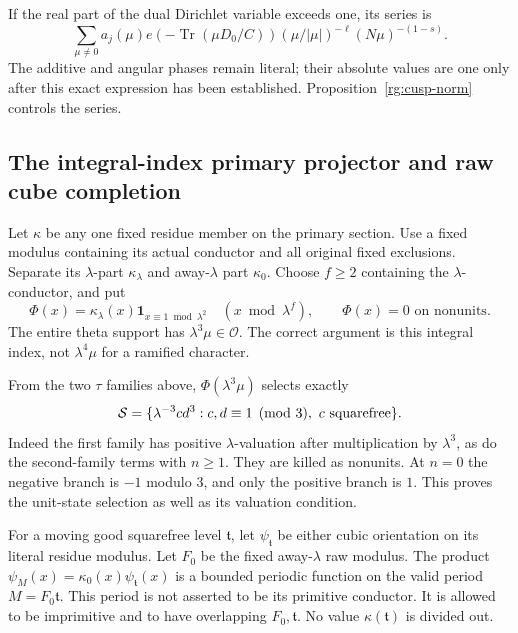 If the real part of the dual Dirichlet variable exceeds one, its series is
\begin{equation}\label{rg:dual-translated-series}
 \sum_{\mu\ne0}a_j(\mu)e(-\operatorname{Tr}(\mu D_0/C))
       (\mu/|\mu|)^{-\ell}(N\mu)^{-(1-s)} .
\end{equation}
The additive and angular phases remain literal; their absolute values
are one only after this exact expression has been established.
Proposition~\ref{rg:cusp-norm} controls the series.

\subsection{The integral-index primary projector and raw cube completion}
\label{rg:projector-proof}
Let \(\kappa\) be any one fixed residue member on the primary section.
Use a fixed modulus containing its actual conductor and all original
fixed exclusions. Separate its \(\lambda\)-part \(\kappa_\lambda\)
and away-\(\lambda\) part \(\kappa_0\).
Choose \(f\ge2\) containing the \(\lambda\)-conductor, and put
\begin{equation}\label{rg:primary-projector}
 \Phi(x)=\kappa_\lambda(x)
               \mathbf1_{x\equiv1\bmod\lambda^2}
          \quad(x\bmod\lambda^f),
 \qquad \Phi(x)=0\text{ on nonunits}.
\end{equation}
The entire theta support has \(\lambda^3\mu\in\mathcal O\).
The correct argument is this integral index, not
\(\lambda^4\mu\) for a ramified character.

From the two \(\tau\) families above, \(\Phi(\lambda^3\mu)\)
selects exactly
\begin{equation}\label{rg:primary-support}
 \mathcal S=\{\lambda^{-3}cd^3:
               c,d\equiv1\pmod3,\ c\ {\rm squarefree}\}.
\end{equation}
Indeed the first family has positive \(\lambda\)-valuation after
multiplication by \(\lambda^3\), as do the second-family terms
with \(n\ge1\). They are killed as nonunits.
At \(n=0\) the negative branch is \(-1\) modulo \(3\),
and only the positive branch is \(1\).
This proves the unit-state selection as well as its valuation condition.

For a moving good squarefree level \(\mathfrak t\), let
\(\psi_{\mathfrak t}\) be either cubic orientation on its literal
residue modulus. Let \(F_0\) be the fixed away-\(\lambda\) raw modulus.
The product
\(\psi_M(x)=\kappa_0(x)\psi_{\mathfrak t}(x)\)
is a bounded periodic function on the valid period
\(M=F_0\mathfrak t\).
This period is not asserted to be its primitive conductor.
It is allowed to be imprimitive and to have overlapping
\(F_0,\mathfrak t\). No value \(\kappa(\mathfrak t)\) is divided out.

